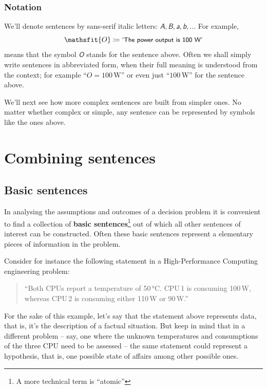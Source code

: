 \documentclass[
  a4paper,
  DIV=11,
  numbers=noendperiod,
  oneside]{scrreprt}
\begin{document}
\hypertarget{notation-1}{%
\subsubsection{Notation}\label{notation-1}}

We'll denote sentences by sans-serif italic letters:
\(\mathsfit{A},\mathsfit{B},\mathsfit{a},\mathsfit{b},\dotsc\) For
example, \[
\mathsfit{O} \coloneqq \textsf{\small`The power output is 100 W'}
\] means that the symbol \(\mathsfit{O}\) stands for the sentence above.
Often we shall simply write sentences in abbreviated form, when their
full meaning is understood from the context; for example
``\(O = 100\,\mathrm{W}\)'' or even just ``\(100\,\mathrm{W}\)'' for the
sentence above.

We'll next see how more complex sentences are built from simpler ones.
No matter whether complex or simple, any sentence can be represented by
symbols like the ones above.

\hypertarget{combining-sentences}{%
\section{Combining sentences}\label{combining-sentences}}

\hypertarget{basic-sentences}{%
\subsection{Basic sentences}\label{basic-sentences}}

In analysing the assumptions and outcomes of a decision problem it is
convenient to find a collection of {\textbf{basic sentences}}\footnote{A
  more technical term is ``atomic''} out of which all other sentences of
interest can be constructed. Often these basic sentences represent a
elementary pieces of information in the problem.

Consider for instance the following statement in a High-Performance
Computing engineering problem:

\begin{quote}
``Both CPUs report a temperature of 50\,°C. CPU\,1 is consuming 100\,W,
whereas CPU\,2 is consuming either 110\,W or 90\,W.''
\end{quote}

For the sake of this example, let's say that the statement above
represents data, that is, it's the description of a factual situation.
But keep in mind that in a different problem -- say, one where the
unknown temperatures and consumptions of the three CPU need to be
assessed -- the same statement could represent a hypothesis, that is,
one possible state of affairs among other possible ones.
\end{document}
